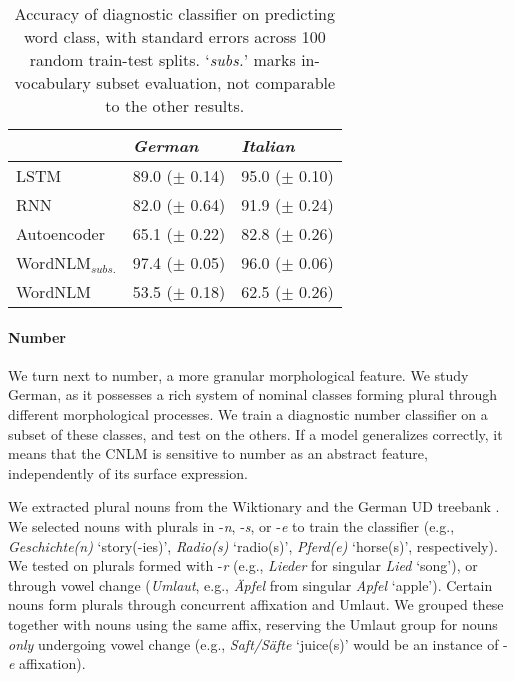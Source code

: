 \begin{table}[t]
\footnotesize
    \begin{center}
      \begin{tabular}{l|l|l}
        &\emph{German}&\emph{Italian}\\
        \hline
        LSTM & 89.0 ($\pm$ 0.14) & 95.0 ($\pm$ 0.10) \\
        RNN & 82.0 ($\pm$ 0.64) & 91.9 ($\pm$ 0.24) \\
        Autoencoder & 65.1 ($\pm$ 0.22) & 82.8 ($\pm$ 0.26) \\
	      WordNLM$_{\textit{subs.}}$ & 97.4 ($\pm$ 0.05) & 96.0 ($\pm$ 0.06) \\
	      WordNLM & 53.5 ($\pm$ 0.18)  & 62.5 ($\pm$ 0.26) \\
      \end{tabular}
    \end{center}
	\caption{\label{tab:pos-results} Accuracy of diagnostic classifier on predicting word class, with standard errors across 100 random train-test splits. `\emph{subs.}' marks in-vocabulary subset evaluation, not comparable to the other results.} %
\end{table}






\paragraph{Number}
We turn next to number, a more granular morphological feature. We
study German, as it possesses a rich system of nominal classes forming
plural through different morphological processes. We train a diagnostic number
classifier on a subset of these classes, and test on the others. If a
model generalizes correctly, it means that the CNLM is sensitive to number
as an abstract feature, independently of its surface expression.

We extracted plural nouns from the Wiktionary and the German UD
treebank \cite{mcdonald2013universal,brants2002tiger}.  We
selected %
nouns with plurals in -\emph{n}, -\emph{s}, or -\emph{e} to train the
classifier (e.g., \emph{Geschichte(n)} `story(-ies)', \emph{Radio(s)}
`radio(s)', \emph{Pferd(e)} `horse(s)', respectively). We tested on
plurals formed with -\emph{r} (e.g., \emph{Lieder} for singular
\emph{Lied} `song'), or through vowel change (\emph{Umlaut}, e.g.,
\emph{{\"A}pfel} from singular \emph{Apfel} `apple'). Certain nouns
form plurals through concurrent affixation and Umlaut. We grouped
these together with nouns using the same affix, reserving the Umlaut
group for nouns \emph{only} undergoing vowel change (e.g.,
\emph{Saft/S\"afte} `juice(s)' would be an instance of -\emph{e}
affixation).

